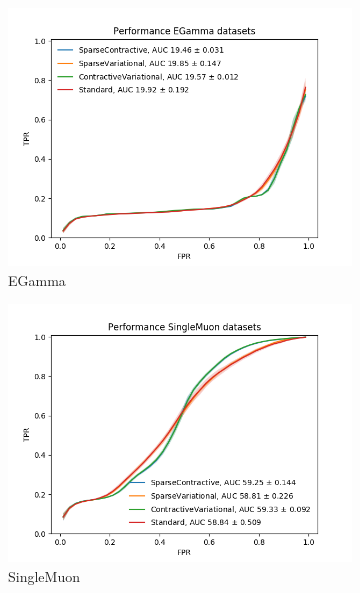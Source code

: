 \begin{figure}[h!]
\centering
    \begin{subfigure}[b]{0.49\linewidth}
        \includegraphics[width=\linewidth]{images/reco/2018/feature_1/performance_EGamma_SparseContractiveSparseVariationalContractiveVariationalStandard.png}
        \caption{EGamma}
    \end{subfigure}
    \begin{subfigure}[b]{0.49\linewidth}
        \includegraphics[width=\linewidth]{images/reco/2018/feature_1/performance_SingleMuon_SparseContractiveSparseVariationalContractiveVariationalStandard.png}
        \caption{SingleMuon}
    \end{subfigure}
    \begin{subfigure}[b]{0.49\linewidth}

\end{subfigure}
\end{figure}
